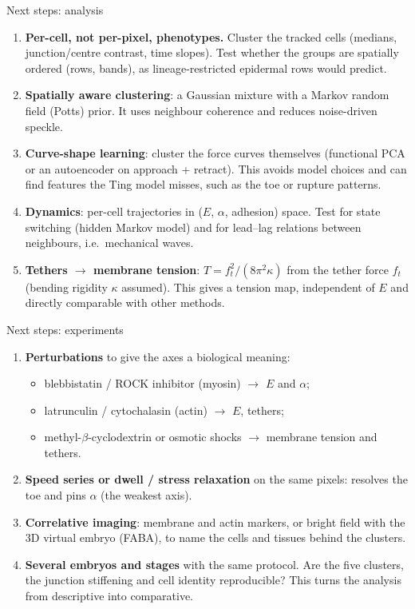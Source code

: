 \documentclass[aspectratio=169,9pt]{beamer}
\begin{document}
\begin{frame}{Next steps: analysis}
\footnotesize
\begin{enumerate}
\item \textbf{Per-cell, not per-pixel, phenotypes.} Cluster the tracked cells (medians, junction/centre contrast, time slopes). Test whether the groups are spatially ordered (rows, bands), as lineage-restricted epidermal rows would predict.
\item \textbf{Spatially aware clustering}: a Gaussian mixture with a Markov random field (Potts) prior. It uses neighbour coherence and reduces noise-driven speckle.
\item \textbf{Curve-shape learning}: cluster the force curves themselves (functional PCA or an autoencoder on approach + retract). This avoids model choices and can find features the Ting model misses, such as the toe or rupture patterns.
\item \textbf{Dynamics}: per-cell trajectories in ($E$, $\alpha$, adhesion) space. Test for state switching (hidden Markov model) and for lead--lag relations between neighbours, i.e.\ mechanical waves.
\item \textbf{Tethers $\to$ membrane tension}: $T = f_t^2/(8\pi^2\kappa)$ from the tether force $f_t$ (bending rigidity $\kappa$ assumed). This gives a tension map, independent of $E$ and directly comparable with other methods.
\end{enumerate}
\end{frame}

\begin{frame}{Next steps: experiments}
\footnotesize
\begin{enumerate}
\item \textbf{Perturbations} to give the axes a biological meaning:
\begin{itemize}\footnotesize
\item blebbistatin / ROCK inhibitor (myosin) $\to$ $E$ and $\alpha$;
\item latrunculin / cytochalasin (actin) $\to$ $E$, tethers;
\item methyl-$\beta$-cyclodextrin or osmotic shocks $\to$ membrane tension and tethers.
\end{itemize}
\item \textbf{Speed series or dwell / stress relaxation} on the same pixels: resolves the toe and pins $\alpha$ (the weakest axis).
\item \textbf{Correlative imaging}: membrane and actin markers, or bright field with the 3D virtual embryo (FABA), to name the cells and tissues behind the clusters.
\item \textbf{Several embryos and stages} with the same protocol. Are the five clusters, the junction stiffening and cell identity reproducible? This turns the analysis from descriptive into comparative.
\end{enumerate}
\end{frame}
\end{document}
